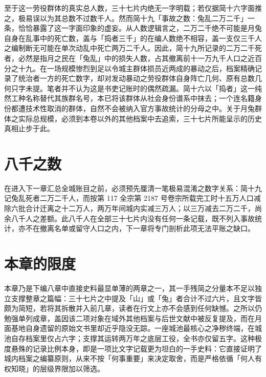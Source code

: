 至于这一劳役群体的真实总人数，三十七片内绝无一字明载；若仅据简十六字面推之，极易误以为其总数不过数千人。然而简十九「事故之数：兔乱二万二千」一条，恰恰暴露了这一字面印象的虚妄。从人数逻辑言之，二万二千绝不可能是月兔自身在乱事中的死亡数，盖与「捣者三千」的在编人数绝不相容，盖一支仅三千人之编制断无可能在单次动乱中死亡两万二千人。因此，简十九所记录的二万二千死者，必然是指月之民在「兔乱」中的损失人数，占其撤离前十一万九千人口之近百分之十九。在一场规模惨烈到足以令城主群体损员近两成的暴动之后，档案精确记录了统治者一方的死亡数字，却对发动暴动之劳役群体自身阵亡几何、原有总数几何只字未提。笔者并不认为这是书吏记账时的偶然疏漏。简十六以「捣者」这一纯然工种名称替代其族群名号，本已将该群体从社会身份谱系中抹去；一个连名籍身份都遭技术性取消的群体，自然不会被纳入官方事故统计的分母之中。关于月兔群体之实际总规模，必须到本卷以外的其他档案中去追索，三十七片所能呈示的历史真相止步于此。

\section{八千之数}

在进入下一章汇总全城账目之前，必须预先厘清一笔极易混淆之数字关系：简十九记兔乱死者二万二千人，而按第 117 全宗第 2187 号卷宗所载完工时十五万人口减除六批合计迁离之十二万人，两万年间城内实减三万人；以三万减去二万二千，尚余八千人之差额。此八千人在全部三十七片内没有任何一条记载，既不列入事故统计，亦不在撤离名单或留守人口之内，下一章将专门剖析此项无法平账之缺口。

\section{本章的限度}

本章乃是下编八章中直接史料最显单薄的两章之一，其一手残简之分量本不足以独立支撑整章之篇幅：三十七片之中提及「山」或「兔」者合计不过六片，且文字皆颇为简短，若将其拆散并入前几章，读者在行文上亦不会感到任何缺憾。之所以仍勉强单列成章，盖因该二项对象在域外其他档案与后世文献中被反复提及，而在月面基地自身遗留的原始文书里却近乎隐没无踪。一座城池最核心之净秽终端，在城池自存档案里仅占六字；支撑其运转两万年之底层工役，全书亦仅留五字。这种极度悬殊的记录比例本身，即是一项比文字记载更为坦白的一手史料：它直接证明了城内档案之编纂原则，从来不按「何事重要」来决定取舍，而是严格依循「何人有权知晓」的层级界限加以筛选。
